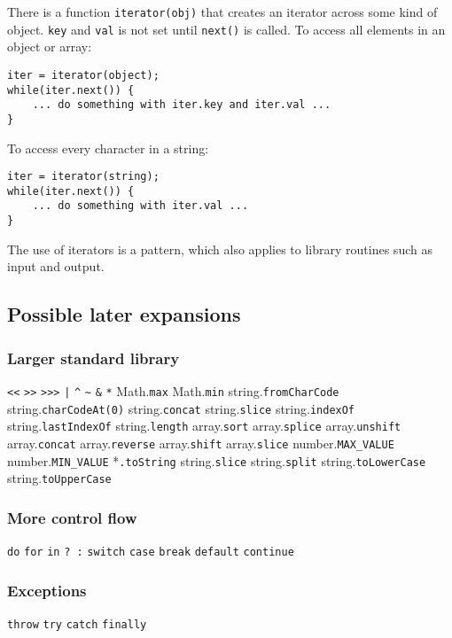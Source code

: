 There is a function \verb|iterator(obj)| that creates an iterator across some kind of object. \verb|key| and \verb|val| is not set until \verb|next()| is called. To access all elements in an object or array:
\begin{verbatim}
iter = iterator(object);
while(iter.next()) {
    ... do something with iter.key and iter.val ...
}
\end{verbatim}
To access every character in a string:
\begin{verbatim}
iter = iterator(string);
while(iter.next()) {
    ... do something with iter.val ...
}
\end{verbatim}

The use of iterators is a pattern, which also applies to library routines such as input and output.



\subsection{Possible later expansions}

\subsubsection{Larger standard library}
\verb|<<|
\verb|>>|
\verb|>>>|
\verb$|$
\verb|^|
\verb|~|
\verb|&|
\verb|*|
Math.\verb|max|
Math.\verb|min|
string.\verb|fromCharCode|
string.\verb|charCodeAt(0)|
string.\verb|concat|
string.\verb|slice|
string.\verb|indexOf|
string.\verb|lastIndexOf|
string.\verb|length|
array.\verb|sort|
array.\verb|splice|
array.\verb|unshift|
array.\verb|concat|
array.\verb|reverse|
array.\verb|shift|
array.\verb|slice|
number.\verb|MAX_VALUE|
number.\verb|MIN_VALUE|
*\verb|.toString|
string.\verb|slice|
string.\verb|split|
string.\verb|toLowerCase|
string.\verb|toUpperCase|



\subsubsection{More control flow}
\verb|do|
\verb|for|
\verb|in|
\verb|? :|
\verb|switch|
\verb|case|
\verb|break|
\verb|default|
\verb|continue|


\subsubsection{Exceptions}
\verb|throw|
\verb|try|
\verb|catch|
\verb|finally|

